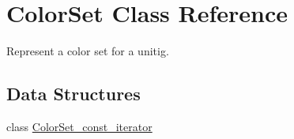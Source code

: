 \hypertarget{classColorSet}{}\section{Color\+Set Class Reference}
\label{classColorSet}


Represent a color set for a unitig.  


\subsection*{Data Structures}
\begin{DoxyCompactItemize}
\item 
class \hyperlink{classColorSet_1_1ColorSet__const__iterator}{Color\+Set\+\_\+const\+\_\+iterator}
\end{DoxyCompactItemize}
